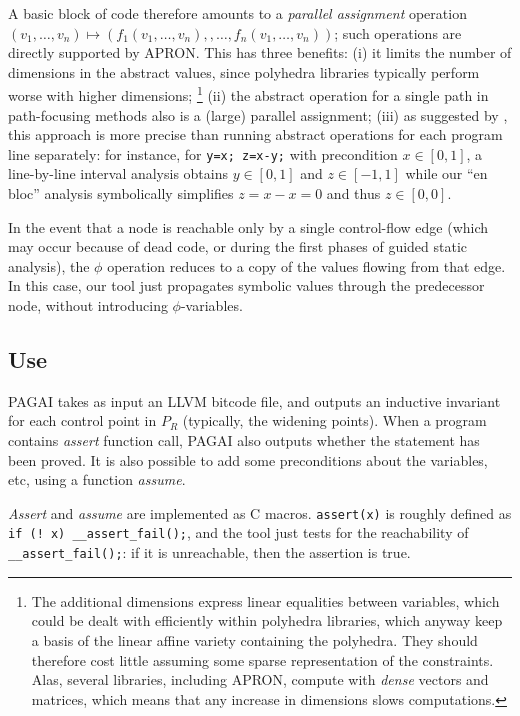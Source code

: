 \documentclass{entcs}
\begin{document}
A basic block of code therefore amounts to a \emph{parallel assignment} operation
$(v_1,\dots,v_n) \allowbreak\mapsto\allowbreak
(f_1(v_1,\dots,v_n), \allowbreak, \dots, \allowbreak
 f_n(v_1,\dots,v_n))$;
such operations are directly supported by APRON. This has three benefits:
(i) it limits the number of dimensions in the abstract values, since polyhedra libraries typically perform worse with higher dimensions;%
\footnote{The additional dimensions express linear equalities between variables, which could be dealt with efficiently within polyhedra libraries, which anyway keep a basis of the linear affine variety containing the polyhedra.
They should therefore cost little assuming some sparse representation of the constraints.
Alas, several libraries, including APRON, compute with \emph{dense} vectors and matrices, which means that any increase in dimensions slows computations.}
(ii) the abstract operation for a single path in path-focusing methods also is a (large) parallel assignment;
(iii) as suggested by \citet{DBLP:conf/vmcai/Mine06}, this approach is more precise than running abstract operations for each program line separately:
for instance, for \lstinline|y=x; z=x-y;| with precondition $x \in [0,1]$, a line-by-line interval analysis obtains $y \in [0,1]$ and $z \in [-1,1]$ while our ``en bloc'' analysis symbolically simplifies $z = x - x = 0$ and thus $z \in [0,0]$.

In the event that a node is reachable only by a single control-flow edge (which may occur because of dead code, or during the first phases of guided static analysis), the $\phi$ operation reduces to a copy of the values flowing from that edge. In this case, our tool just propagates symbolic values through the predecessor node, without introducing $\phi$-variables.

\subsection{Use}

PAGAI takes as input an LLVM bitcode file, and outputs an inductive invariant
for each control point in $P_R$ (typically, the widening points).
When a program contains \emph{assert} function call, PAGAI also outputs whether
the statement has been proved.
It is also possible to add some preconditions about the variables, etc, using a
function \emph{assume}.

\emph{Assert} and \emph{assume} are implemented as C macros. \lstinline|assert(x)| is roughly defined as \lstinline|if (! x) __assert_fail();|, and the tool just tests for the reachability of \lstinline|__assert_fail();|: if it is unreachable, then the assertion is true.
\end{document}
